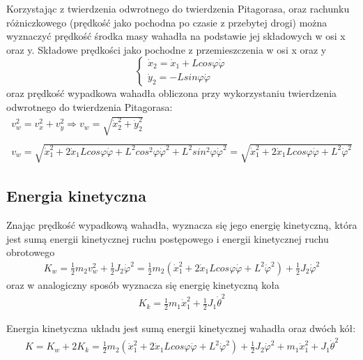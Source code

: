 Korzystając z twierdzenia odwrotnego do twierdzenia Pitagorasa, oraz rachunku różniczkowego (prędkość jako pochodna po czasie z przebytej drogi) można wyznaczyć prędkość środka masy wahadła na podstawie jej składowych w osi x oraz y. Składowe prędkości jako pochodne z przemieszczenia w osi x oraz y
$$
    \left\{
    \begin{array}{c}
    \dot{x}_2 = \dot{x}_1 + Lcos\varphi\dot{\varphi} \\
    \dot{y}_2 = -Lsin\varphi\dot{\varphi}
    \end{array}
    \right.
$$
oraz prędkość wypadkowa wahadła obliczona przy wykorzystaniu twierdzenia odwrotnego do twierdzenia Pitagorasa:
\begin{equation}
    \begin{array}{ll}
    v_w^2 = v_x^2 + v_y^2 \Rightarrow v_w = \sqrt{\dot{x}_2^2 + \dot{y}_2^2} \\ \\
    v_w = \sqrt{\dot{x}_1^2 + 2\dot{x}_1Lcos\varphi\dot{\varphi} + L^2cos^2\varphi\dot{\varphi}^2 + L^2sin^2\varphi\dot{\varphi}^2} = \sqrt{\dot{x}_1^2 + 2\dot{x}_1Lcos\varphi\dot{\varphi} + L^2\dot{\varphi}^2}
    \end{array}
\end{equation}

\subsection{Energia kinetyczna}
Znając prędkość wypadkową wahadła, wyznacza się jego energię kinetyczną, która jest sumą energii kinetycznej ruchu postępowego i energii kinetycznej ruchu obrotowego
$$
    \begin{array}{ll}
    K_w = \frac{1}{2}m_2v_w^2 + \frac{1}{2}J_2\dot{\varphi}^2 = \frac{1}{2}m_2(\dot{x}_1^2 + 2\dot{x}_1Lcos\varphi\dot{\varphi} + L^2\dot{\varphi}^2) + \frac{1}{2}J_2\dot{\varphi}^2
    \end{array}
$$
oraz w analogiczny sposób wyznacza się energię kinetyczną koła
$$
    \begin{array}{ll}
    K_k = \frac{1}{2}m_1\dot{x}_1^2 + \frac{1}{2}J_1\dot{\theta}^2
    \end{array}
$$

Energia kinetyczna układu jest sumą energii kinetycznej wahadła oraz dwóch kół:
\begin{equation}
    \begin{array}{ll}
    K = K_w + 2K_k = \frac{1}{2}m_2(\dot{x}_1^2 + 2\dot{x}_1Lcos\varphi\dot{\varphi} + L^2\dot{\varphi}^2) + \frac{1}{2}J_2\dot{\varphi}^2 + m_1\dot{x}_1^2 + J_1\dot{\theta}^2
    \end{array}
\end{equation}


